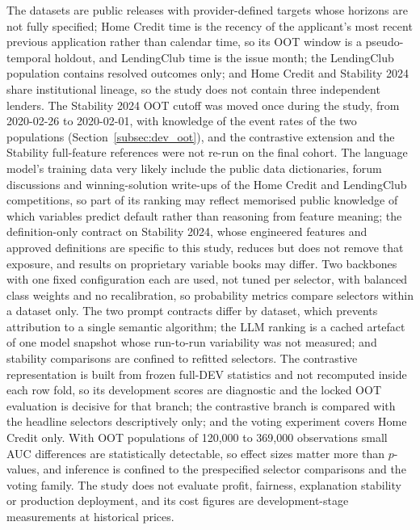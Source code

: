 \documentclass[final,5p,twocolumn]{elsarticle}
\begin{document}
The datasets are public releases with provider-defined targets whose horizons are not fully specified; Home Credit time is the recency of the applicant's most recent previous application rather than calendar time, so its OOT window is a pseudo-temporal holdout, and LendingClub time is the issue month; the LendingClub population contains resolved outcomes only; and Home Credit and Stability 2024 share institutional lineage, so the study does not contain three independent lenders. The Stability 2024 OOT cutoff was moved once during the study, from 2020-02-26 to 2020-02-01, with knowledge of the event rates of the two populations (Section~\ref{subsec:dev_oot}), and the contrastive extension and the Stability full-feature references were not re-run on the final cohort. The language model's training data very likely include the public data dictionaries, forum discussions and winning-solution write-ups of the Home Credit and LendingClub competitions, so part of its ranking may reflect memorised public knowledge of which variables predict default rather than reasoning from feature meaning; the definition-only contract on Stability 2024, whose engineered features and approved definitions are specific to this study, reduces but does not remove that exposure, and results on proprietary variable books may differ. Two backbones with one fixed configuration each are used, not tuned per selector, with balanced class weights and no recalibration, so probability metrics compare selectors within a dataset only. The two prompt contracts differ by dataset, which prevents attribution to a single semantic algorithm; the LLM ranking is a cached artefact of one model snapshot whose run-to-run variability was not measured; and stability comparisons are confined to refitted selectors. The contrastive representation is built from frozen full-DEV statistics and not recomputed inside each row fold, so its development scores are diagnostic and the locked OOT evaluation is decisive for that branch; the contrastive branch is compared with the headline selectors descriptively only; and the voting experiment covers Home Credit only. With OOT populations of 120,000 to 369,000 observations small AUC differences are statistically detectable, so effect sizes matter more than $p$-values, and inference is confined to the prespecified selector comparisons and the voting family. The study does not evaluate profit, fairness, explanation stability or production deployment, and its cost figures are development-stage measurements at historical prices.

\end{document}
